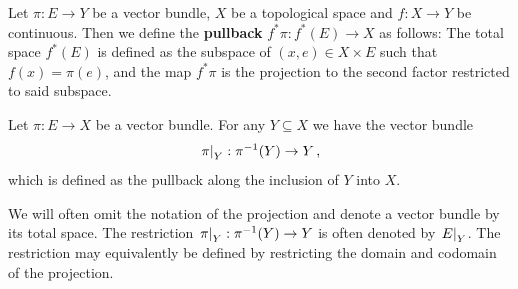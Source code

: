\begin{definition} \label{def:vb-pullbackOfVerctorBundles}
	Let $\pi: E\to Y$ be a vector bundle, $X$ be a topological space and $f: X\to Y$ be continuous. Then we define the \textbf{pullback} $f^*{\pi}:f^*(E) \to X$ as follows: 
	The total space $f^*(E)$ is defined as the subspace of $(x,e)\in X\times E$ such that $f(x)=\pi(e)$, and the map $f^*{\pi}$ is the projection to the second factor restricted to said subspace.
\end{definition}
\begin{example}
	Let $\pi:E\to X$ be a vector bundle. For any $Y\subseteq X$ we have the vector bundle 
	\begin{equation*}
		\left.\pi\right|_{Y}:\pi^{-1}(Y)\to Y\,,
	\end{equation*} which is defined as the pullback along the inclusion of $Y$ into $X$. 
\end{example}
\begin{remark}\label{rem:vb-restrictionOfBundles}
	We will often omit the notation of the projection and denote a vector bundle by its total space. The restriction $	\left.\pi\right|_{Y}:\pi^{-1}(Y)\to Y$ is often denoted by $\left.E\right|_{Y}$. The restriction may equivalently be defined by restricting the domain and codomain of the projection. 
\end{remark}

